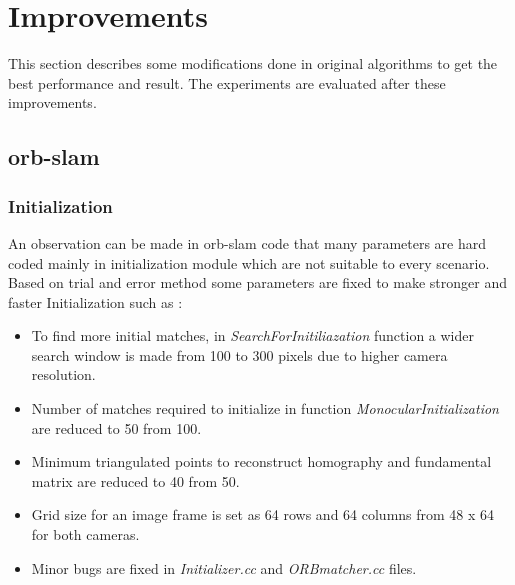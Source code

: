 \section{Improvements}
This section describes some modifications done in original algorithms to get the best performance and result. The experiments are evaluated after these improvements. 

\subsection{\acrshort{orb}-\acrshort{slam}}
\subsubsection{Initialization}
An observation can be made in \acrshort{orb}-\acrshort{slam} code that many parameters are hard coded mainly in initialization module which are not suitable to every scenario. Based on trial and error method some parameters are fixed to make stronger and faster Initialization such as :
\begin{itemize} 
   	\item To find more initial matches, in \textit{SearchForInitiliazation} function  a wider search window is made from 100 to 300 pixels due to higher camera resolution.
	\item Number of matches required to initialize in function \textit{MonocularInitialization} are reduced to 50 from 100.
 	\item Minimum triangulated points to reconstruct homography and fundamental matrix are reduced to 40 from 50. 
 	\item Grid size for an image frame is set as 64 rows and 64 columns from 48 x 64 for both cameras. 
	\item Minor bugs are fixed in \textit{Initializer.cc} and \textit{ORBmatcher.cc} files.
\end{itemize}
